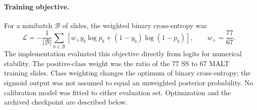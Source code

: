\paragraph{Training objective.}
For a minibatch $\mathcal{B}$ of slides, the weighted binary cross-entropy was
\begin{equation}\label{eq:loss}
 \mathcal{L}=-\frac{1}{|\mathcal{B}|}\sum_{b\in\mathcal{B}}
 \left[w_{+}y_b\log p_b+(1-y_b)\log(1-p_b)\right],
 \qquad w_{+}=\frac{77}{67}.
\end{equation}
The implementation evaluated this objective directly from logits for numerical
stability. The positive-class weight was the ratio of the 77 SS to 67 MALT
training slides. Class weighting changes the optimum of binary cross-entropy;
the sigmoid output was not assumed to equal an unweighted posterior probability.
No calibration model was fitted to either evaluation set. Optimization and the
archived checkpoint are described below.
